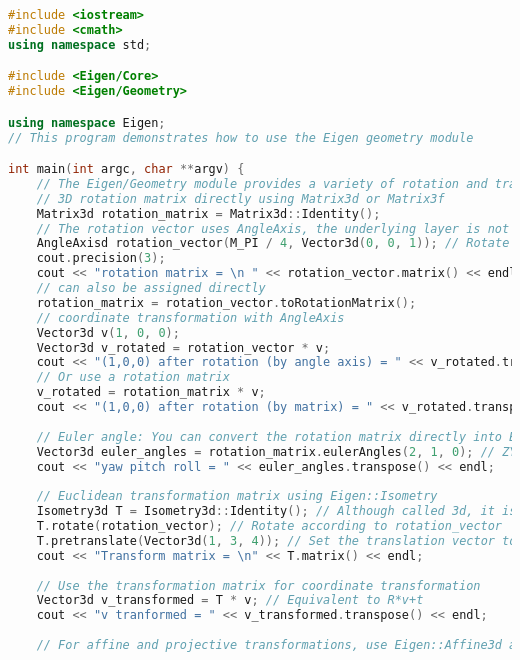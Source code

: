 \begin{lstlisting}[language=c++,caption=slambook2/ch3/useGeometry/useGeometry.cpp]
#include <iostream>
#include <cmath>
using namespace std;

#include <Eigen/Core>
#include <Eigen/Geometry>

using namespace Eigen;
// This program demonstrates how to use the Eigen geometry module

int main(int argc, char **argv) {
	// The Eigen/Geometry module provides a variety of rotation and translation representations
	// 3D rotation matrix directly using Matrix3d or Matrix3f
	Matrix3d rotation_matrix = Matrix3d::Identity();
	// The rotation vector uses AngleAxis, the underlying layer is not directly Matrix, but the operation can be treated as a matrix (because the operator is overloaded)
	AngleAxisd rotation_vector(M_PI / 4, Vector3d(0, 0, 1)); // Rotate 45 degrees along the Z axis
	cout.precision(3);
	cout << "rotation matrix = \n " << rotation_vector.matrix() << endl; // convert to matrix with matrix()
	// can also be assigned directly
	rotation_matrix = rotation_vector.toRotationMatrix();
	// coordinate transformation with AngleAxis
	Vector3d v(1, 0, 0);
	Vector3d v_rotated = rotation_vector * v;
	cout << "(1,0,0) after rotation (by angle axis) = " << v_rotated.transpose() << endl;
	// Or use a rotation matrix
	v_rotated = rotation_matrix * v;
	cout << "(1,0,0) after rotation (by matrix) = " << v_rotated.transpose() << endl;
	
	// Euler angle: You can convert the rotation matrix directly into Euler angles
	Vector3d euler_angles = rotation_matrix.eulerAngles(2, 1, 0); // ZYX order, ie roll pitch yaw order
	cout << "yaw pitch roll = " << euler_angles.transpose() << endl;
	
	// Euclidean transformation matrix using Eigen::Isometry
	Isometry3d T = Isometry3d::Identity(); // Although called 3d, it is essentially a 4*4 matrix
	T.rotate(rotation_vector); // Rotate according to rotation_vector
	T.pretranslate(Vector3d(1, 3, 4)); // Set the translation vector to (1,3,4)
	cout << "Transform matrix = \n" << T.matrix() << endl;
	
	// Use the transformation matrix for coordinate transformation
	Vector3d v_transformed = T * v; // Equivalent to R*v+t
	cout << "v tranformed = " << v_transformed.transpose() << endl;
	
	// For affine and projective transformations, use Eigen::Affine3d and Eigen::Projective3d.
	

\end{lstlisting}
